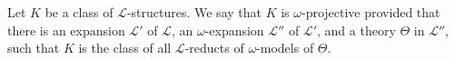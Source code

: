 Let $K$ be a class of $\mathcal{L}$-structures. We say that $K$ is $\omega$-projective provided that there is an expansion $\mathcal{L}'$ of $\mathcal{L}$, an $\omega$-expansion $\mathcal{L}''$ of $\mathcal{L}'$, and a theory $\Theta$ in $\mathcal{L}''$, such that $K$ is the class of all $\mathcal{L}$-reducts of $\omega$-models of $\Theta$.
